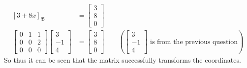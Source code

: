 \documentclass{report}
\begin{document}
\[
\begin{aligned}
[3 + 8x]_{\mathfrak{B}} & = \begin{bmatrix} 3 \\ 8 \\ 0 \end{bmatrix} \\
\begin{bmatrix} 
0 & 1 & 1 \\
0 & 0 & 2 \\
0 & 0 & 0
\end{bmatrix} \begin{bmatrix}
3 \\ -1 \\ 4
\end{bmatrix} & = \begin{bmatrix}
3 \\ 8 \\ 0
\end{bmatrix}
\qquad
\left(
\begin{bmatrix}
3 \\ -1 \\ 4
\end{bmatrix} \text{ is from the previous question}
\right)
\end{aligned}
\]
So thus it can be seen that the matrix successfully transforms the coordinates.
\end{document}

